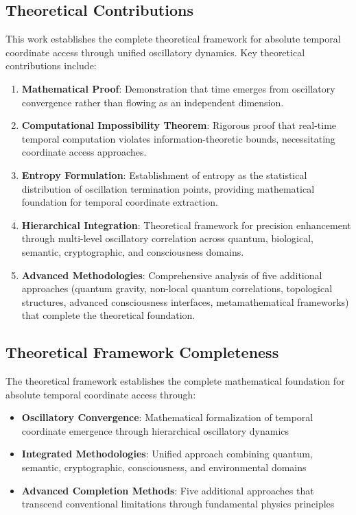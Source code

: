 \documentclass[11pt]{article}
\theoremstyle{remark}
\begin{document}
\subsection{Theoretical Contributions}

This work establishes the complete theoretical framework for absolute temporal coordinate access through unified oscillatory dynamics. Key theoretical contributions include:

\begin{enumerate}
\item \textbf{Mathematical Proof}: Demonstration that time emerges from oscillatory convergence rather than flowing as an independent dimension.

\item \textbf{Computational Impossibility Theorem}: Rigorous proof that real-time temporal computation violates information-theoretic bounds, necessitating coordinate access approaches.

\item \textbf{Entropy Formulation}: Establishment of entropy as the statistical distribution of oscillation termination points, providing mathematical foundation for temporal coordinate extraction.

\item \textbf{Hierarchical Integration}: Theoretical framework for precision enhancement through multi-level oscillatory correlation across quantum, biological, semantic, cryptographic, and consciousness domains.

\item \textbf{Advanced Methodologies}: Comprehensive analysis of five additional approaches (quantum gravity, non-local quantum correlations, topological structures, advanced consciousness interfaces, metamathematical frameworks) that complete the theoretical foundation.
\end{enumerate}

\subsection{Theoretical Framework Completeness}

The theoretical framework establishes the complete mathematical foundation for absolute temporal coordinate access through:

\begin{itemize}
\item \textbf{Oscillatory Convergence}: Mathematical formalization of temporal coordinate emergence through hierarchical oscillatory dynamics
\item \textbf{Integrated Methodologies}: Unified approach combining quantum, semantic, cryptographic, consciousness, and environmental domains
\item \textbf{Advanced Completion Methods}: Five additional approaches that transcend conventional limitations through fundamental physics principles
\end{itemize}
\end{document}
